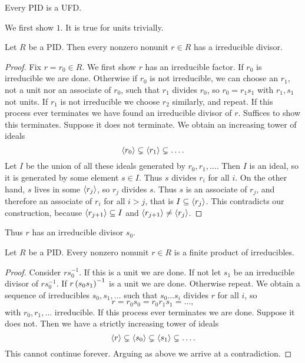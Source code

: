\begin{theorem}
\label{thm:3.3.2}
Every PID is a UFD.
\end{theorem}

We first show $ 1 $. It is true for units trivially.

\begin{lemma}
Let $ R $ be a PID. Then every nonzero nonunit $ r \in R $ has a irreducible divisor.
\end{lemma}

\begin{proof}
Fix $ r = r_0 \in R $. We first show $ r $ has an irreducible factor. If $ r_0 $ is irreducible we are done. Otherwise if $ r_0 $ is not irreducible, we can choose an $ r_1 $, not a unit nor an associate of $ r_0 $, such that $ r_1 $ divides $ r_0 $, so $ r_0 = r_1s_1 $ with $ r_1, s_1 $ not units. If $ r_1 $ is not irreducible we choose $ r_2 $ similarly, and repeat. If this process ever terminates we have found an irreducible divisor of $ r $. Suffices to show this terminates. Suppose it does not terminate. We obtain an increasing tower of ideals
$$ \left\langle r_0 \right\rangle \subsetneq \left\langle r_1 \right\rangle \subsetneq \dots. $$
Let $ I $ be the union of all these ideals generated by $ r_0, r_1, \dots $. Then $ I $ is an ideal, so it is generated by some element $ s \in I $. Thus $ s $ divides $ r_i $ for all $ i $. On the other hand, $ s $ lives in some $ \left\langle r_j \right\rangle $, so $ r_j $ divides $ s $. Thus $ s $ is an associate of $ r_j $, and therefore an associate of $ r_i $ for all $ i > j $, that is $ I \subseteq \left\langle r_j \right\rangle $. This contradicts our construction, because $ \left\langle r_{j + 1} \right\rangle \subseteq I $ and $ \left\langle r_{j + 1} \right\rangle \ne \left\langle r_j \right\rangle $.
\end{proof}

Thus $ r $ has an irreducible divisor $ s_0 $.

\begin{lemma}
Let $ R $ be a PID. Every nonzero nonunit $ r \in R $ is a finite product of irreducibles.
\end{lemma}

\begin{proof}
Consider $ rs_0^{-1} $. If this is a unit we are done. If not let $ s_1 $ be an irreducible divisor of $ rs_0^{-1} $. If $ r\left( s_0s_1 \right)^{-1} $ is a unit we are done. Otherwise repeat. We obtain a sequence of irreducibles $ s_0, s_1, \dots $ such that $ s_0 \dots s_i $ divides $ r $ for all $ i $, so
$$ r = r_0s_0 = r_0r_1s_1 = \dots, $$
with $ r_0, r_1, \dots $ irreducible. If this process ever terminates we are done. Suppose it does not. Then we have a strictly increasing tower of ideals
$$ \left\langle r \right\rangle \subsetneq \left\langle s_0 \right\rangle \subsetneq \left\langle s_1 \right\rangle \subsetneq \dots. $$
This cannot continue forever. Arguing as above we arrive at a contradiction.
\end{proof}

